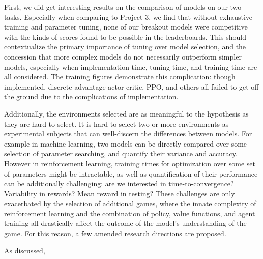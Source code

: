 \documentclass[conference]{IEEEtran}
\begin{document}
First, we did get interesting results on the comparison of models on our two tasks. Especially when comparing to Project 3, we find that without exhaustive training and parameter tuning, none of our breakout models were competitive with the kinds of scores found to be possible in the leaderboards. This should contextualize the primary importance of tuning over model selection, and the concession that more complex models do not necessarily outperform simpler models, especially when implementation time, tuning time, and training time are all considered. The training figures demonstrate this complication: though implemented, discrete advantage actor-critic, PPO, and others all failed to get off the ground due to the complications of implementation.

Additionally, the environments selected are as meaningful to the hypothesis as they are hard to select. It is hard to select two or more environments as experimental subjects that can well-discern the differences between models. For example in machine learning, two models can be directly compared over some selection of parameter searching, and quantify their variance and accuracy. However in reinforcement learning, training times for optimization over some set of parameters might be intractable, as well as quantification of their performance can be additionally challenging: are we interested in time-to-convergence? Variability in rewards? Mean reward in testing? These challenges are only exacerbated by the selection of additional games, where the innate complexity of reinforcement learning and the combination of policy, value functions, and agent training all drastically affect the outcome of the model's understanding of the game. For this reason, a few amended research directions are proposed.

As discussed, 

{}


\vspace{12pt}
\end{document}
